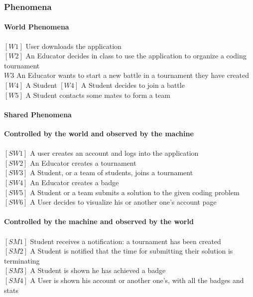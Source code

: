 \documentclass{article}
\begin{document}
      \subsubsection{Phenomena}
        {\setlength{\leftskip}{2em}
            \paragraph{World Phenomena}
            $[W1]$ User downloads the application\\
            $[W2]$ An Educator decides in class to use the application to organize a coding tournament\\
            ${W3}$ An Educator wants to start a new battle in a tournament they have created \\
            $[W4]$ A Student 
            $[W4]$ A Student decides to join a battle\\
            $[W5]$ A Student contacts some mates to form a team

            \paragraph{Shared Phenomena}
            \textbf{Controlled by the world and observed by the machine} \\\\
            $[SW1]$ A user creates an account and logs into the application\\
            $[SW2]$ An Educator creates a tournament\\
            $[SW3]$ A Student, or a team of students, joins a tournament\\
            $[SW4]$ An Educator creates a badge\\
            $[SW5]$ A Student or a team submits a solution to the given coding problem\\
            $[SW6]$ A User decides to visualize his or another one's account page
\\\\
            \textbf{Controlled by the machine and observed by the world}\\\\
            $[SM1]$ Student receives a notification: a tournament has been created \\
            $[SM2]$ A Student is notified that the time for submitting their solution is terminating\\
            $[SM3]$ A Student is shown he has achieved a badge\\
            $[SM4]$ A User is shown his account or another one's, with all the badges and stats

            }
\end{document}
